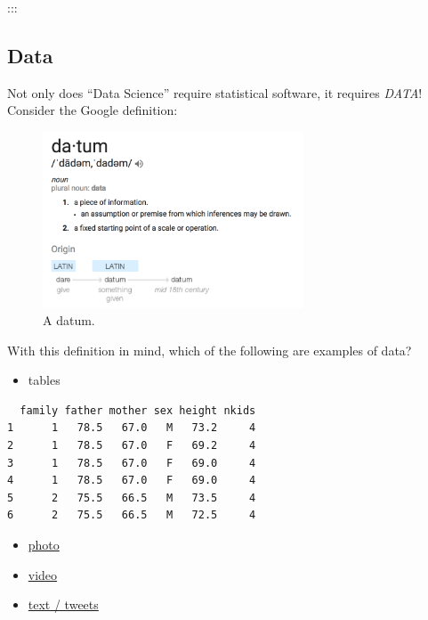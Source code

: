 \documentclass[
  letterpaper,
  DIV=11,
  numbers=noendperiod]{scrreprt}
\providecommand{\tightlist}{%
  \setlength{\itemsep}{0pt}\setlength{\parskip}{0pt}}\usepackage{longtable,booktabs,array}
\begin{document}
:::

\subsection{Data}\label{data}

Not only does ``Data Science'' require statistical software, it requires
\emph{DATA}! Consider the Google definition:

\begin{figure}[H]

{\centering \includegraphics[width=3.05in,height=\textheight]{src/../images/datum.png}

}

\caption{A datum.}

\end{figure}%

With this definition in mind, which of the following are examples of
data?

\begin{itemize}
\tightlist
\item
  tables
\end{itemize}

\begin{verbatim}
  family father mother sex height nkids
1      1   78.5   67.0   M   73.2     4
2      1   78.5   67.0   F   69.2     4
3      1   78.5   67.0   F   69.0     4
4      1   78.5   67.0   F   69.0     4
5      2   75.5   66.5   M   73.5     4
6      2   75.5   66.5   M   72.5     4
\end{verbatim}

\begin{itemize}
\item
  \href{https://www.google.com/search?hl=en&biw=1439&bih=656&tbm=isch&sa=1&q=messy+college+dorm+rooms&oq=messy+college+dorm+rooms&gs_l=psy-ab.3...20720.21922.0.22183.6.6.0.0.0.0.143.552.4j2.6.0....0...1.1.64.psy-ab..1.1.142...0i13k1.uaj5gYQ4t50}{photo}
\item
  \href{https://www.youtube.com/watch?v=wMm7VdH05jY}{video}
\item
  \href{https://twitter.com/data4blacklives?lang=en}{text / tweets}
\end{itemize}
\end{document}
